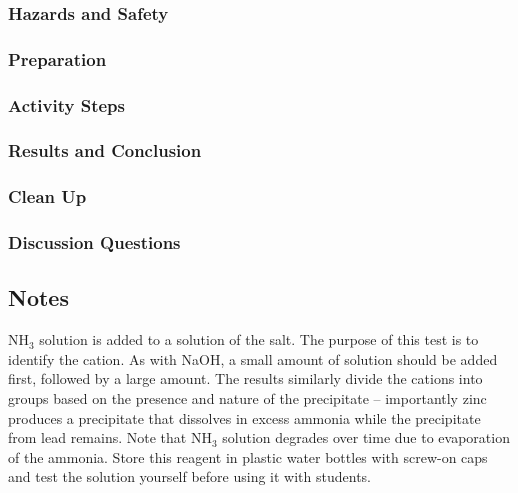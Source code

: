 \subsubsection{Hazards and Safety}


\subsubsection{Preparation}
\begin{enumerate}
\end{enumerate}

\subsubsection{Activity Steps}
\begin{enumerate}
\end{enumerate}

\subsubsection{Results and Conclusion}


\subsubsection{Clean Up}
\begin{enumerate}
\end{enumerate}


\subsubsection{Discussion Questions}
\begin{enumerate}
\end{enumerate}

\subsection{Notes}

NH$_{3}$ solution is added to a solution of the salt. 
The purpose of this test is to identify the cation. 
As with NaOH, 
a small amount of solution should be added first, 
followed by a large amount. 
The results similarly divide the cations into groups 
based on the presence and nature of the precipitate – 
importantly zinc produces a precipitate that dissolves in excess ammonia 
while the precipitate from lead remains. 
Note that NH$_{3}$ solution degrades over time 
due to evaporation of the ammonia. 
Store this reagent in plastic water bottles with screw-on caps 
and test the solution yourself before using it with students.


